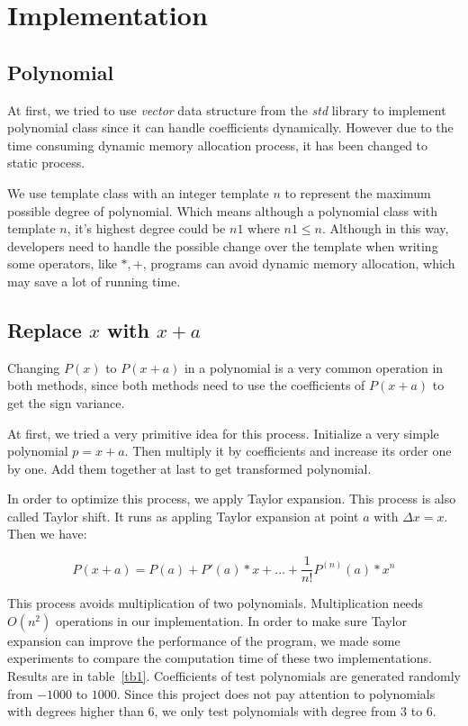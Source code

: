 \section{Implementation} \label{implementation}

\subsection{Polynomial} 

At first, we tried to use \textit{vector} data structure from the \textit{std}
library to implement polynomial class since it can handle coefficients
dynamically. However due to the time consuming dynamic memory allocation process,
it has been changed to static process.  

We use template class with an integer template $n$ to represent the maximum
possible degree of polynomial. Which means although a polynomial class with
template $n$, it's highest degree could be $n1$ where $n1 \leq n$. Although in
this way, developers need to handle the possible change over the template when
writing some operators, like $*,+$, programs can avoid dynamic memory
allocation, which may save a lot of running time.

\subsection{Replace $x$ with $x+a$}

Changing $P(x)$ to $P(x+a)$ in a polynomial is a very common operation in both
methods, since both methods need to use the coefficients of $P(x+a)$ to get the
sign variance. 

At first, we tried a very primitive idea for this process. Initialize a very
simple polynomial $p = x+ a$. Then multiply it by coefficients and increase its
order one by one. Add them together at last to get transformed polynomial.

In order to optimize this process, we apply Taylor expansion. This process is
also called Taylor shift\cite{Taylor}. It runs as appling Taylor expansion at
point $a$ with $\Delta x = x$. Then we have:

$$
P(x+a) = P(a) + P'(a) *x + ... + \frac{1}{n!}P^{(n)}(a)*x^n
$$

This process avoids multiplication of two polynomials. Multiplication needs
$O(n^2)$ operations in our implementation. In order to make sure Taylor
expansion can improve the performance of the program, we made some experiments
to compare the computation time of these two implementations. Results are in
table~\ref{tb1}.  Coefficients of test polynomials are generated randomly from
$-1000$ to $1000$. Since this project does not pay attention to polynomials with
degrees higher than 6, we only test polynomials with degree from 3 to 6.


